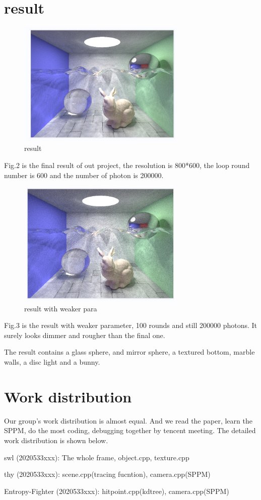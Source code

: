 \documentclass[acmtog]{acmart}
\begin{document}
\section{result}
\begin{figure}[h]
	\includegraphics[width=8cm,height=6cm]{result.png}
	\caption{result}
\end{figure}
Fig.2 is the final result of out project, the resolution is 800*600, the loop round number is 600 and the number of photon is 200000.
\begin{figure}[h]
	\includegraphics[width=8cm,height=6cm]{result100.png}
	\caption{result with weaker para}
\end{figure}

Fig.3 is the result with weaker parameter, 100 rounds and still 200000 photons. It surely looks dimmer and rougher than the final one.

The result contains a glass sphere, and mirror sphere, a textured bottom, marble walls, a disc light and a bunny.


\section{Work distribution} 

Our group's work distribution is almost equal. And we read the paper, learn the SPPM, do the most coding, debugging together by tencent meeting.
The detailed work distribution is shown below.

swl (2020533xxx): The whole frame, object.cpp, texture.cpp

thy (2020533xxx): scene.cpp(tracing fucntion), camera.cpp(SPPM)

Entropy-Fighter (2020533xxx): hitpoint.cpp(kdtree), camera.cpp(SPPM)
\end{document}
